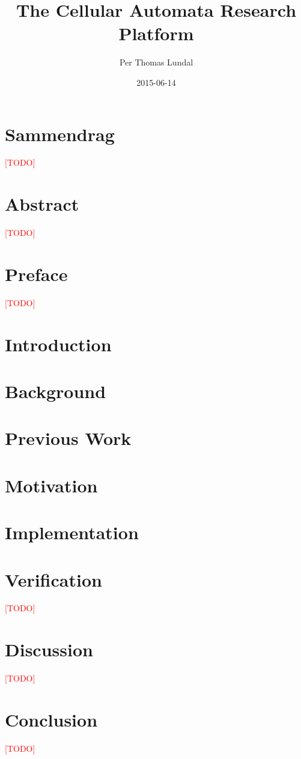 \documentclass[a4paper]{report}
\title{
    {The Cellular Automata Research Platform}\\
    \TODO
}
\author{Per Thomas Lundal}
\date{2015-06-14}
\newcommand\TODO{\textcolor{red}{[TODO]}}
\begin{document}
\maketitle

\newpage
{}

\chapter*{Sammendrag}
    \TODO

\chapter*{Abstract}
    \TODO

\chapter*{Preface}
    \TODO

\setcounter{tocdepth}{2}
\tableofcontents

\newpage
{}

\chapter{Introduction}
    \label{ch:introduction}
    

\chapter{Background}
    \label{ch:background}
    

\chapter{Previous Work}
    \label{ch:previous-work}
    

\chapter{Motivation}
    \label{ch:motivation}
    

\chapter{Implementation}
    \label{ch:implementation}
    

\chapter{Verification}
    \label{ch:verification}
    \TODO

\chapter{Discussion}
    \label{ch:discussion}
    \TODO

\chapter{Conclusion}
    \label{ch:conclusion}
    \TODO



\end{document}
